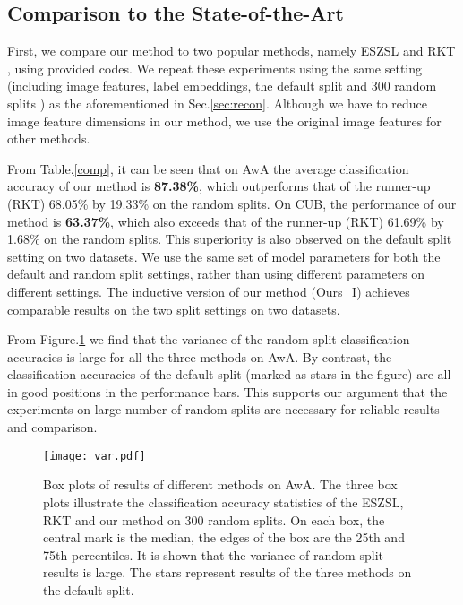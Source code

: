 \documentclass{article}
\begin{document}
\subsection{Comparison to the State-of-the-Art}

First, we compare our method to two popular methods, namely ESZSL \cite{romera2015embarrassingly} and RKT \cite{wang2016relational}, using provided codes. We repeat these experiments using the same setting (including image features, label embeddings, the default split and 300 random splits ) as the aforementioned in Sec.\ref{sec:recon}. Although we have to reduce image feature dimensions in our method, we use the original image features for other methods.

From Table.\ref{comp}, it can be seen that on AwA the average classification accuracy of our method is \textbf{87.38\%}, which outperforms that of the runner-up (RKT) 68.05\% by {19.33\%} on the random splits. On CUB, the performance of our method is \textbf{63.37\%}, which also exceeds that of the runner-up (RKT) 61.69\% by {1.68\%} on the random splits. This superiority is also observed on the default split setting on two datasets. We use the same set of model parameters for both the default and random split settings, rather than using different parameters on different settings. The inductive version of our method (Ours\_I) achieves comparable results on the two split settings on two datasets.

From Figure.\ref{fig:var} we find that the variance of the random split classification accuracies is large for all the three methods on AwA. By contrast, the classification accuracies of the default split (marked as stars in the figure) are all in good positions in the performance bars. This supports our argument that the experiments on large number of random splits are necessary for reliable results and comparison.

\begin{figure}[t]
  \centering
  \texttt{[image: var.pdf]}
  \caption{Box plots of results of different methods on AwA. The three box plots illustrate the classification accuracy statistics of the ESZSL, RKT and our method on 300 random splits. On each box, the central mark is the median, the edges of the box are the 25th and 75th percentiles. It is shown that the variance of random split results is large. The stars represent results of the three methods on the default split.}
  \label{fig:var}
\end{figure}
\end{document}
